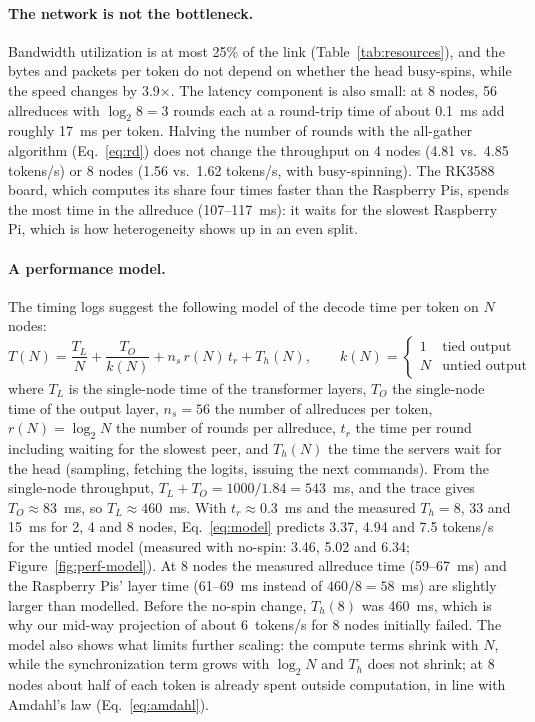 \documentclass[11pt,a4paper]{article}
\begin{document}
\paragraph{The network is not the bottleneck.} Bandwidth utilization is at most 25\% of the link (Table~\ref{tab:resources}), and the bytes and packets per token do not depend on whether the head busy-spins, while the speed changes by 3.9$\times$. The latency component is also small: at 8 nodes, 56 allreduces with $\log_2 8 = 3$ rounds each at a round-trip time of about 0.1~ms add roughly 17~ms per token. Halving the number of rounds with the all-gather algorithm (Eq.~\ref{eq:rd}) does not change the throughput on 4 nodes (4.81 vs.\ 4.85 tokens/s) or 8 nodes (1.56 vs.\ 1.62 tokens/s, with busy-spinning). The RK3588 board, which computes its share four times faster than the Raspberry Pis, spends the most time in the allreduce (107--117~ms): it waits for the slowest Raspberry Pi, which is how heterogeneity shows up in an even split.

\paragraph{A performance model.} The timing logs suggest the following model of the decode time per token on $N$ nodes:
\begin{equation}
T(N) = \frac{T_{L}}{N} + \frac{T_{O}}{k(N)} + n_{s}\, r(N)\, t_{r} + T_{h}(N),
\qquad k(N) = \begin{cases} 1 & \text{tied output} \\ N & \text{untied output} \end{cases}
\label{eq:model}
\end{equation}
where $T_L$ is the single-node time of the transformer layers, $T_O$ the single-node time of the output layer, $n_s = 56$ the number of allreduces per token, $r(N)=\log_2 N$ the number of rounds per allreduce, $t_r$ the time per round including waiting for the slowest peer, and $T_h(N)$ the time the servers wait for the head (sampling, fetching the logits, issuing the next commands). From the single-node throughput, $T_L + T_O = 1000/1.84 = 543$~ms, and the trace gives $T_O \approx 83$~ms, so $T_L \approx 460$~ms. With $t_r \approx 0.3$~ms and the measured $T_h = 8$, 33 and 15~ms for 2, 4 and 8 nodes, Eq.~\ref{eq:model} predicts 3.37, 4.94 and 7.5 tokens/s for the untied model (measured with no-spin: 3.46, 5.02 and 6.34; Figure~\ref{fig:perf-model}). At 8 nodes the measured allreduce time (59--67~ms) and the Raspberry Pis' layer time (61--69~ms instead of $460/8 = 58$~ms) are slightly larger than modelled. Before the no-spin change, $T_h(8)$ was 460~ms, which is why our mid-way projection of about 6~tokens/s for 8 nodes initially failed. The model also shows what limits further scaling: the compute terms shrink with $N$, while the synchronization term grows with $\log_2 N$ and $T_h$ does not shrink; at 8 nodes about half of each token is already spent outside computation, in line with Amdahl's law (Eq.~\ref{eq:amdahl}).
\end{document}

